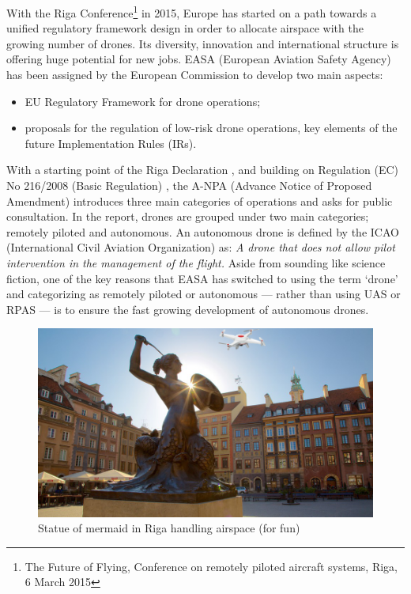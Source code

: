 With the Riga Conference\footnote{The Future of Flying, Conference on remotely piloted aircraft systems, Riga, 6 March 2015} in 2015, Europe has started on a path towards a unified regulatory framework design in order to allocate airspace with the growing number of drones. 
Its diversity, innovation and international structure is offering huge potential for new jobs. 
EASA (European Aviation Safety Agency) has been assigned by the European Commission to develop two main aspects:

\begin{itemize}
\item{EU Regulatory Framework for drone operations;}
\item{proposals for the regulation of low-risk drone operations, key elements of the future Implementation Rules (IRs).}
\end{itemize}


With a starting point of the Riga Declaration \cite{rigaDeclaration}, and building on Regulation (EC) No 216/2008 (Basic Regulation) \cite{basicRegulation}, the A-NPA (Advance Notice of Proposed Amendment) \cite{A_NPA_EASA2015} introduces three main categories of operations and asks for public consultation. 
In the report, drones are grouped under two main categories; remotely piloted and autonomous. 
An autonomous drone is defined by the ICAO (International Civil Aviation Organization) \cite{ICAO_RPASmanuel} as: \emph{A drone that does not allow pilot intervention in the management of the flight.} 
Aside from sounding like science fiction, one of the key reasons that EASA has switched to using the term `drone' and categorizing as remotely piloted or autonomous --- rather than using UAS or RPAS --- is to ensure the fast growing development of autonomous drones.

\begin{figure}
\begin{center}
\includegraphics[width=11.3cm]{figures/mermaid_statue_drone}
\caption{Statue of mermaid in Riga handling airspace (for fun)} 
\label{fig:mermaid_statue_drone}
\end{center}
\end{figure}


